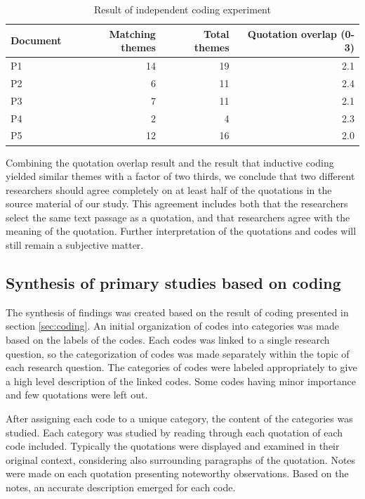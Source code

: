\begin{table}
    \centering
    \begin{tabular}{ l r r r }
        \toprule
        Document    &  Matching themes  &  Total themes  &  Quotation overlap (0-3) \\
        \midrule
        P1          &  14  &  19   &  2.1  \\
        P2          &   6  &  11   &  2.4  \\
        P3          &   7  &  11   &  2.1  \\
        P4          &   2  &   4   &  2.3  \\
        P5          &  12  &  16   &  2.0  \\
        \bottomrule
    \end{tabular}
    \caption{Result of independent coding experiment}
    \label{table:codingexperiment}
\end{table}

Combining the quotation overlap result and the result that inductive coding
yielded similar themes with a factor of two thirds, we conclude that two
different researchers should agree completely on at least half of the quotations
in the source material of our study. This agreement includes both that the
researchers select the same text passage as a quotation, and that researchers
agree with the meaning of the quotation. Further interpretation of the
quotations and codes will still remain a subjective matter.


\subsection{Synthesis of primary studies based on coding}

The synthesis of findings was created based on the result of coding presented in
section \ref{sec:coding}. An initial organization of codes into categories was
made based on the labels of the codes. Each codes was linked to a single
research question, so the categorization of codes was made separately within
the topic of each research question. The categories of codes were labeled
appropriately to give a high level description of the linked codes. Some codes
having minor importance and few quotations were left out.

After assigning each code to a unique category, the content of the categories
was studied. Each category was studied by reading through each quotation of each
code included. Typically the quotations were displayed and examined in their
original context, considering also surrounding paragraphs of the quotation.
Notes were made on each quotation presenting noteworthy observations. Based on
the notes, an accurate description emerged for each code.

